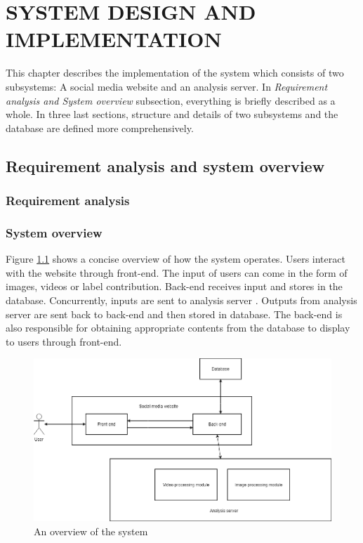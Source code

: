 \chapter{SYSTEM DESIGN AND IMPLEMENTATION}

This chapter describes the implementation of the system which consists of two subsystems: A social media website and an analysis server. In \textit{Requirement analysis and System overview} subsection, everything is briefly described as a whole. In three last sections, structure and details of two subsystems and the database are defined more comprehensively.

\section{Requirement analysis and system overview}
\subsection{Requirement analysis}

\subsection{System overview}
Figure \ref{chap3:system_overview_basic} shows a concise overview of how the system operates. Users interact with the website through front-end. The input of users can come in the form of images, videos or label contribution. Back-end receives input and stores in the database. Concurrently, inputs are sent to analysis server . Outputs from analysis server are sent back to back-end and then stored in database. The back-end is also responsible for obtaining appropriate contents from the database to display to users through front-end.

\begin{center}
    \begin{figure}[H]
    \centering
    \includegraphics[width=1\columnwidth]{images/chap3/system_overview_basic.png}
    \caption{An overview of the system}
    \label{chap3:system_overview_basic}
    \end{figure}
\end{center}
